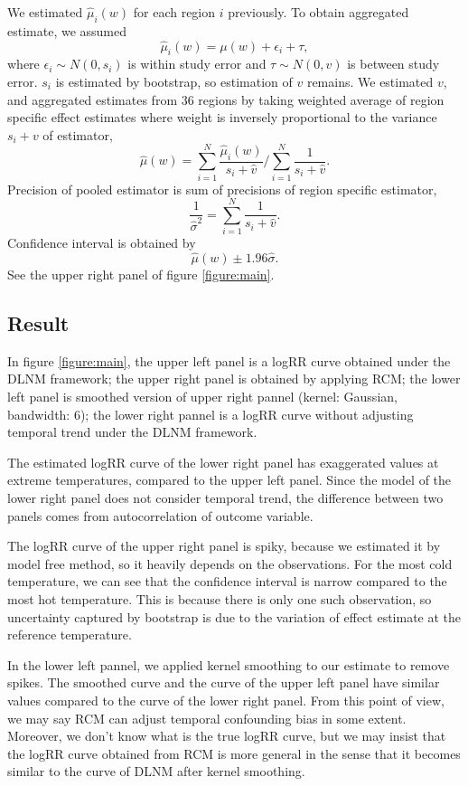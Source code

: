\documentclass[12pt]{article}
\begin{document}
We estimated $\hat{\mu}_i(w)$ for each region $i$ previously.
To obtain aggregated estimate, we assumed
\[
	\hat{\mu}_i(w) = \mu(w) + \epsilon_i + \tau,
\]
where $\epsilon_i \sim N(0, s_i)$ is within study error and $\tau \sim N(0, v)$ is between study error.
$s_i$ is estimated by bootstrap,
so estimation of $v$ remains.
We estimated $v$, and aggregated estimates from 36 regions
by taking weighted average of region specific effect estimates
where weight is inversely proportional to the variance $s_i + v$ of estimator,
\[
	\hat{\mu}(w) = \sum_{i = 1}^N \frac{\hat{\mu}_i(w)}{s_i + \hat{v}}
	/\sum_{i = 1}^N \frac{1}{s_i + \hat{v}}.
\]
Precision of pooled estimator is sum of precisions of region specific estimator,
\[
	\frac{1}{\hat{\sigma}^2} = \sum_{i = 1}^N \frac{1}{s_i + \hat{v}}.
\]
Confidence interval is obtained by 
\[
	\hat{\mu}(w) \pm 1.96 \hat{\sigma}.
\]
See the upper right panel of figure \ref{figure:main}.


\subsection{Result}

In figure \ref{figure:main},
the upper left panel is a logRR curve obtained under the DLNM framework;
the upper right panel is obtained by applying RCM;
the lower left panel is smoothed version of upper right pannel (kernel: Gaussian, bandwidth: $6$);
the lower right pannel is a logRR curve without adjusting temporal trend under the DLNM framework.

The estimated logRR curve of the lower right panel has exaggerated values at extreme temperatures,
compared to the upper left panel.
Since the model of the lower right panel does not consider temporal trend,
the difference between two panels comes from autocorrelation of outcome variable.

The logRR curve of the upper right panel is spiky,
because we estimated it by model free method, so it heavily depends on the observations.
For the most cold temperature, 
we can see that the confidence interval is narrow compared to the most hot temperature.
This is because there is only one such observation,
so uncertainty captured by bootstrap is due to the variation of effect estimate at the reference temperature.

In the lower left pannel, we applied kernel smoothing to our estimate to remove spikes.
The smoothed curve and the curve of the upper left panel have similar values 
compared to the curve of the lower right panel.
From this point of view, 
we may say RCM can adjust temporal confounding bias in some extent.
Moreover, we don't know what is the true logRR curve,
but we may insist that the logRR curve obtained from RCM is more general
in the sense that it becomes similar to the curve of DLNM after kernel smoothing.
\end{document}
